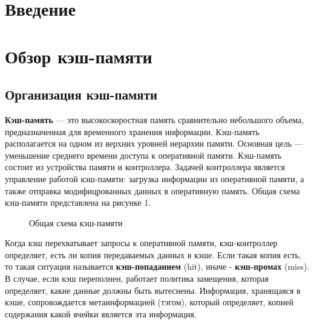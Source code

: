 \documentclass[13pt]{article}
\begin{document}
	\section*{Введение}
	\newpage
	\section{Обзор кэш-памяти}
	\subsection{Организация кэш-памяти}
	\textbf{Кэш-память} --- это высокоскоростная память сравнительно небольшого объема, предназначенная для временного хранения информации. Кэш-память располагается на одном из верхних уровней иерархии памяти. Основная цель --- уменьшение среднего времени доступа к оперативной памяти. 
	Кэш-память состоит из устройства памяти и контроллера. Задачей контроллера является управление работой кэш-памяти: загрузка информации из оперативной памяти, а также отправка модифицрованных данных в оперативную память. Общая схема кэш-памяти представлена на рисунке 1.
	\begin{figure}[h!]
		\caption{Общая схема кэш-памяти}
	\end{figure}
	
	Когда кэш перехватывает запросы к оперативной памяти, кэш-контроллер определяет, есть ли копия передаваемых данных в кэше. Если такая копия есть, то такая ситуация называется \textbf{кэш-попаданием} (hit), иначе - \textbf{кэш-промах} (miss). В случае, если кэш переполнен, работает политика замещения, которая определяет, какие данные должны быть вытеснены. Информация, хранящаяся в кэше, сопровождается метаинформацией (тэгом), который определяет, копией содержания какой ячейки является эта информация.
	
\end{document}
